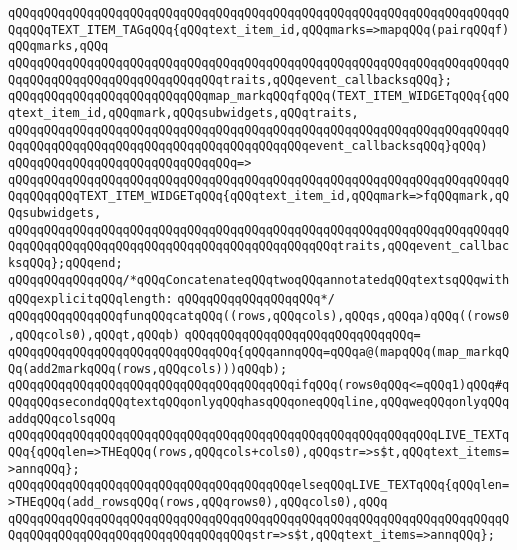\verb|qQQqqQQqqQQqqQQqqQQqqQQqqQQqqQQqqQQqqQQqqQQqqQQqqQQqqQQqqQQqqQQqqQQqqQQqqQQqTEXT_ITEM_TAGqQQq{qQQqtext_item_id,qQQqmarks=>mapqQQq(pairqQQqf)qQQqmarks,qQQq|\newline
\verb|qQQqqQQqqQQqqQQqqQQqqQQqqQQqqQQqqQQqqQQqqQQqqQQqqQQqqQQqqQQqqQQqqQQqqQQqqQQqqQQqqQQqqQQqqQQqqQQqqQQqtraits,qQQqevent_callbacksqQQq};|\newline
\verb|qQQqqQQqqQQqqQQqqQQqqQQqqQQqmap_markqQQqfqQQq(TEXT_ITEM_WIDGETqQQq{qQQqtext_item_id,qQQqmark,qQQqsubwidgets,qQQqtraits,|\newline
\verb|qQQqqQQqqQQqqQQqqQQqqQQqqQQqqQQqqQQqqQQqqQQqqQQqqQQqqQQqqQQqqQQqqQQqqQQqqQQqqQQqqQQqqQQqqQQqqQQqqQQqqQQqqQQqqQQqevent_callbacksqQQq}qQQq)|\newline
\verb|qQQqqQQqqQQqqQQqqQQqqQQqqQQqqQQq=>|\newline
\verb|qQQqqQQqqQQqqQQqqQQqqQQqqQQqqQQqqQQqqQQqqQQqqQQqqQQqqQQqqQQqqQQqqQQqqQQqqQQqqQQqTEXT_ITEM_WIDGETqQQq{qQQqtext_item_id,qQQqmark=>fqQQqmark,qQQqsubwidgets,|\newline
\verb|qQQqqQQqqQQqqQQqqQQqqQQqqQQqqQQqqQQqqQQqqQQqqQQqqQQqqQQqqQQqqQQqqQQqqQQqqQQqqQQqqQQqqQQqqQQqqQQqqQQqqQQqqQQqqQQqqQQqtraits,qQQqevent_callbacksqQQq};qQQqend;|\newline
\newline
\verb|qQQqqQQqqQQqqQQq/*qQQqConcatenateqQQqtwoqQQqannotatedqQQqtextsqQQqwithqQQqexplicitqQQqlength:|\newline
\verb|qQQqqQQqqQQqqQQqqQQq*/|\newline
\verb|qQQqqQQqqQQqqQQqfunqQQqcatqQQq((rows,qQQqcols),qQQqs,qQQqa)qQQq((rows0,qQQqcols0),qQQqt,qQQqb)|\newline
\verb|qQQqqQQqqQQqqQQqqQQqqQQqqQQqqQQq=|\newline
\verb|qQQqqQQqqQQqqQQqqQQqqQQqqQQqqQQq{qQQqannqQQq=qQQqa@(mapqQQq(map_markqQQq(add2markqQQq(rows,qQQqcols)))qQQqb);|\newline
\verb|qQQqqQQqqQQqqQQqqQQqqQQqqQQqqQQqqQQqqQQqifqQQq(rows0qQQq<=qQQq1)qQQq#qQQqqQQqsecondqQQqtextqQQqonlyqQQqhasqQQqoneqQQqline,qQQqweqQQqonlyqQQqaddqQQqcolsqQQq|\newline
\verb|qQQqqQQqqQQqqQQqqQQqqQQqqQQqqQQqqQQqqQQqqQQqqQQqqQQqqQQqqQQqLIVE_TEXTqQQq{qQQqlen=>THEqQQq(rows,qQQqcols+cols0),qQQqstr=>s$t,qQQqtext_items=>annqQQq};|\newline
\verb|qQQqqQQqqQQqqQQqqQQqqQQqqQQqqQQqqQQqqQQqelseqQQqLIVE_TEXTqQQq{qQQqlen=>THEqQQq(add_rowsqQQq(rows,qQQqrows0),qQQqcols0),qQQq|\newline
\verb|qQQqqQQqqQQqqQQqqQQqqQQqqQQqqQQqqQQqqQQqqQQqqQQqqQQqqQQqqQQqqQQqqQQqqQQqqQQqqQQqqQQqqQQqqQQqqQQqqQQqqQQqstr=>s$t,qQQqtext_items=>annqQQq};|\newline

